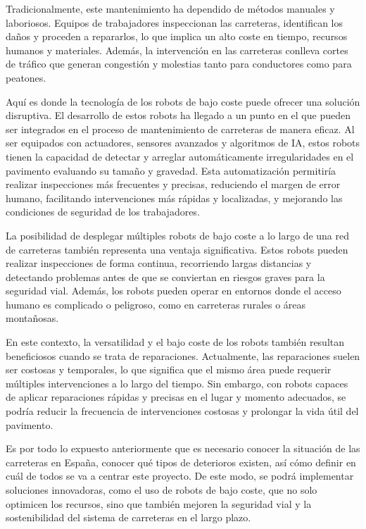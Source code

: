Tradicionalmente, este mantenimiento ha dependido de métodos manuales y laboriosos. Equipos de trabajadores inspeccionan las carreteras, identifican los daños y proceden a repararlos, lo que implica un alto coste en tiempo, recursos humanos y materiales. Además, la intervención en las carreteras conlleva cortes de tráfico que generan congestión y molestias tanto para conductores como para peatones.

Aquí es donde la tecnología de los robots de bajo coste puede ofrecer una solución disruptiva. El desarrollo de estos robots ha llegado a un punto en el que pueden ser integrados en el proceso de mantenimiento de carreteras de manera eficaz. Al ser equipados con actuadores, sensores avanzados y algoritmos de \ac{IA}, estos robots tienen la capacidad de detectar y arreglar automáticamente irregularidades en el pavimento evaluando su tamaño y gravedad. Esta automatización permitiría realizar inspecciones más frecuentes y precisas, reduciendo el margen de error humano, facilitando intervenciones más rápidas y localizadas, y mejorando las condiciones de seguridad de los trabajadores.

La posibilidad de desplegar múltiples robots de bajo coste a lo largo de una red de carreteras también representa una ventaja significativa. Estos robots pueden realizar inspecciones de forma continua, recorriendo largas distancias y detectando problemas antes de que se conviertan en riesgos graves para la seguridad vial. Además, los robots pueden operar en entornos donde el acceso humano es complicado o peligroso, como en carreteras rurales o áreas montañosas.

En este contexto, la versatilidad y el bajo coste de los robots también resultan beneficiosos cuando se trata de reparaciones. Actualmente, las reparaciones suelen ser costosas y temporales, lo que significa que el mismo área puede requerir múltiples intervenciones a lo largo del tiempo. Sin embargo, con robots capaces de aplicar reparaciones rápidas y precisas en el lugar y momento adecuados, se podría reducir la frecuencia de intervenciones costosas y prolongar la vida útil del pavimento. 

Es por todo lo expuesto anteriormente que es necesario conocer la situación de las carreteras en España, conocer qué tipos de deterioros existen, así cómo definir en cuál de todos se va a centrar este proyecto. De este modo, se podrá implementar soluciones innovadoras, como el uso de robots de bajo coste, que no solo optimicen los recursos, sino que también mejoren la seguridad vial y la sostenibilidad del sistema de carreteras en el largo plazo.


